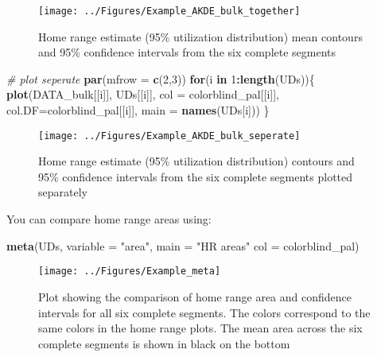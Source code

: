 \documentclass[
]{article}
\newenvironment{Shaded}{\begin{snugshade}}{\end{snugshade}}
\newcommand{\AttributeTok}[1]{\textcolor[rgb]{0.13,0.29,0.53}{#1}}
\newcommand{\CommentTok}[1]{\textcolor[rgb]{0.56,0.35,0.01}{\textit{#1}}}
\newcommand{\ControlFlowTok}[1]{\textcolor[rgb]{0.13,0.29,0.53}{\textbf{#1}}}
\newcommand{\DecValTok}[1]{\textcolor[rgb]{0.00,0.00,0.81}{#1}}
\newcommand{\FunctionTok}[1]{\textcolor[rgb]{0.13,0.29,0.53}{\textbf{#1}}}
\newcommand{\NormalTok}[1]{#1}
\newcommand{\SpecialCharTok}[1]{\textcolor[rgb]{0.81,0.36,0.00}{\textbf{#1}}}
\newcommand{\StringTok}[1]{\textcolor[rgb]{0.31,0.60,0.02}{#1}}
\begin{document}
\begin{figure}[H]

{\centering \texttt{[image: ../Figures/Example\_AKDE\_bulk\_together]} 

}

\caption{Home range estimate (95\% utilization distribution) mean contours and 95\% confidence intervals from the six complete segments}\label{fig:unnamed-chunk-31}
\end{figure}

\begin{Shaded}
\begin{Highlighting}[]
\CommentTok{\# plot seperate}
\FunctionTok{par}\NormalTok{(}\AttributeTok{mfrow =} \FunctionTok{c}\NormalTok{(}\DecValTok{2}\NormalTok{,}\DecValTok{3}\NormalTok{))}
\ControlFlowTok{for}\NormalTok{(i }\ControlFlowTok{in} \DecValTok{1}\SpecialCharTok{:}\FunctionTok{length}\NormalTok{(UDs))\{}
  \FunctionTok{plot}\NormalTok{(DATA\_bulk[[i]], UDs[[i]], }
       \AttributeTok{col =}\NormalTok{ colorblind\_pal[[i]], }
       \AttributeTok{col.DF=}\NormalTok{colorblind\_pal[[i]], }
       \AttributeTok{main =} \FunctionTok{names}\NormalTok{(UDs[i]))}
\NormalTok{\}}
\end{Highlighting}
\end{Shaded}

\begin{figure}[H]

{\centering \texttt{[image: ../Figures/Example\_AKDE\_bulk\_seperate]} 

}

\caption{Home range estimate (95\% utilization distribution) contours and 95\% confidence intervals from the six complete segments plotted separately}\label{fig:unnamed-chunk-34}
\end{figure}

You can compare home range areas using:

\begin{Shaded}
\begin{Highlighting}[]
\FunctionTok{meta}\NormalTok{(UDs, }\AttributeTok{variable =} \StringTok{"area"}\NormalTok{, }\AttributeTok{main =} \StringTok{"HR areas"} \AttributeTok{col =}\NormalTok{ colorblind\_pal)}
\end{Highlighting}
\end{Shaded}

\begin{figure}[H]

{\centering \texttt{[image: ../Figures/Example\_meta]} 

}

\caption{Plot showing the comparison of home range area and confidence intervals for all six complete segments. The colors correspond to the same colors in the home range plots. The mean area across the six complete segments is shown in black on the bottom}\label{fig:unnamed-chunk-38}
\end{figure}
\end{document}
